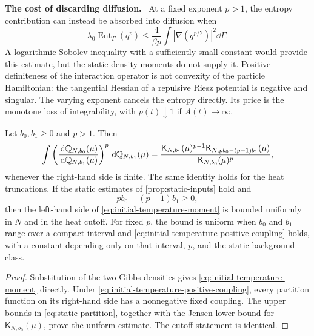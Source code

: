 \documentclass[11pt,reqno]{amsart}
\numberwithin{equation}{section}
\theoremstyle{plain}
\theoremstyle{remark}
\newcommand{\K}{\mathsf K}\newcommand{\g}{\mathsf g}\newcommand{\Fr}{\mathsf F}
\DeclareMathOperator{\Ent}{Ent}\DeclareMathOperator{\TV}{TV}\DeclareMathOperator{\Var}{Var}
\newcommand{\parheading}[1]{\par\medskip\noindent\textbf{#1}\ }
\begin{document}
\parheading{The cost of discarding diffusion.}
At a fixed exponent $p>1$, the entropy contribution can instead be absorbed into diffusion when
\begin{equation}\label{eq:fixed-exponent-absorption}
 \lambda_0\Ent_\Gamma(q^p)
 \le \frac{4}{\beta p}\int|\nabla(q^{p/2})|^2\dd\Gamma.
\end{equation}
A logarithmic Sobolev inequality with a sufficiently small constant would provide this estimate, but the static density moments do not supply it. Positive definiteness of the interaction operator is not convexity of the particle Hamiltonian: the tangential Hessian of a repulsive Riesz potential is negative and singular. The varying exponent cancels the entropy directly. Its price is the monotone loss of integrability, with $p(t)\downarrow1$ if $A(t)\to\infty$.

\begin{lemma}\label{lem:initial-temperature}
Let $b_0,b_1\ge0$ and $p>1$. Then
\begin{equation}\label{eq:initial-temperature-moment}
 \int\left(\frac{\dd\Q_{N,b_0}(\mu)}{\dd\Q_{N,b_1}(\mu)}\right)^p
 \dd\Q_{N,b_1}(\mu)
 =\frac{\K_{N,b_1}(\mu)^{p-1}
 \K_{N,pb_0-(p-1)b_1}(\mu)}{\K_{N,b_0}(\mu)^p},
\end{equation}
whenever the right-hand side is finite. The same identity holds for the heat truncations. If the static estimates of \cref{prop:static-inputs} hold and
\begin{equation}\label{eq:initial-temperature-positive-coupling}
 pb_0-(p-1)b_1\ge0,
\end{equation}
then the left-hand side of \eqref{eq:initial-temperature-moment} is bounded uniformly in $N$ and in the heat cutoff. For fixed $p$, the bound is uniform when $b_0$ and $b_1$ range over a compact interval and \eqref{eq:initial-temperature-positive-coupling} holds, with a constant depending only on that interval, $p$, and the static background class.
\end{lemma}
\begin{proof}
Substitution of the two Gibbs densities gives \eqref{eq:initial-temperature-moment} directly. Under \eqref{eq:initial-temperature-positive-coupling}, every partition function on its right-hand side has a nonnegative fixed coupling. The upper bounds in \eqref{eq:static-partition}, together with the Jensen lower bound for $\K_{N,b_0}(\mu)$, prove the uniform estimate. The cutoff statement is identical.
\end{proof}
\end{document}

